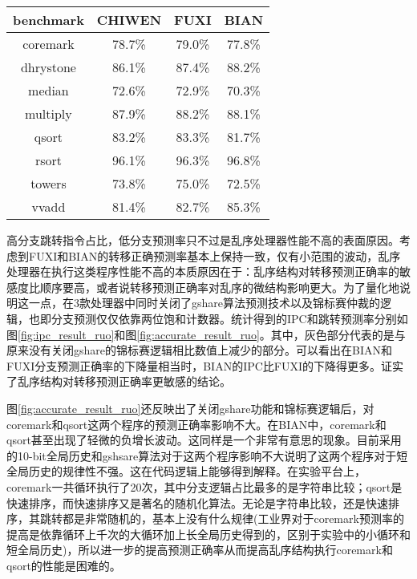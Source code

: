 \begin{table}[!htbp]
	\label{tab:accurate_result_ruo}
	\centering
	\footnotesize%
	\setlength{\tabcolsep}{4pt}%
	\renewcommand{\arraystretch}{1.2}%
	\begin{tabular}{cccc}
		\hline
		benchmark & CHIWEN & FUXI & BIAN \\%
		\hline
		coremark    & 78.7\% & 79.0\% & 77.8\% \\
		dhrystone   & 86.1\% & 87.4\% & 88.2\% \\
		median 		& 72.6\% & 72.9\% & 70.3\% \\
		multiply 	& 87.9\% & 88.2\% & 88.1\% \\
		qsort  		& 83.2\% & 83.3\% & 81.7\% \\
		rsort  		& 96.1\% & 96.3\% & 96.8\% \\
		towers 		& 73.8\% & 75.0\% & 72.5\% \\
		vvadd 		& 81.4\% & 82.7\% & 85.3\% \\
		\hline
	\end{tabular}
\end{table}

高分支跳转指令占比，低分支预测率只不过是乱序处理器性能不高的表面原因。考虑到FUXI和BIAN的转移正确预测率基本上保持一致，仅有小范围的波动，乱序处理器在执行这类程序性能不高的本质原因在于：乱序结构对转移预测正确率的敏感度比顺序要高，或者说转移预测正确率对乱序的微结构影响更大。为了量化地说明这一点，在3款处理器中同时关闭了gshare算法预测技术以及锦标赛仲裁的逻辑，也即分支预测仅仅依靠两位饱和计数器。统计得到的IPC和跳转预测率分别如图\ref{fig:ipc_result_ruo}和图\ref{fig:accurate_result_ruo}。其中，灰色部分代表的是与原来没有关闭gshare的锦标赛逻辑相比数值上减少的部分。可以看出在BIAN和FUXI分支预测正确率的下降量相当时，BIAN的IPC比FUXI的下降得更多。证实了乱序结构对转移预测正确率更敏感的结论。

图\ref{fig:accurate_result_ruo}还反映出了关闭gshare功能和锦标赛逻辑后，对coremark和qsort这两个程序的预测正确率影响不大。在BIAN中，coremark和qsort甚至出现了轻微的负增长波动。这同样是一个非常有意思的现象。目前采用的10-bit全局历史和gshsare算法对于这两个程序影响不大说明了这两个程序对于短全局历史的规律性不强。这在代码逻辑上能够得到解释。在实验平台上，coremark一共循环执行了20次，其中分支逻辑占比最多的是字符串比较；qsort是快速排序，而快速排序又是著名的随机化算法。无论是字符串比较，还是快速排序，其跳转都是非常随机的，基本上没有什么规律(工业界对于coremark预测率的提高是依靠循环上千次的大循环加上长全局历史得到的，区别于实验中的小循环和短全局历史)，所以进一步的提高预测正确率从而提高乱序结构执行coremark和qsort的性能是困难的。

